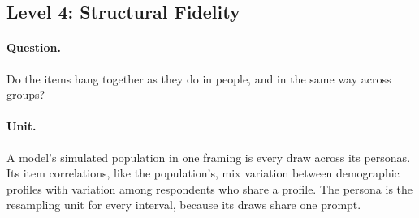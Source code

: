 \subsection*{Level 4: Structural Fidelity}
\label{sec:s7-l4}

\paragraph{Question.}
Do the items hang together as they do in people, and in the same way across groups?

\paragraph{Unit.}
A model's simulated population in one framing is every draw across its personas.
Its item correlations, like the population's, mix variation between demographic profiles with variation among respondents who share a profile.
The persona is the resampling unit for every interval, because its draws share one prompt.

